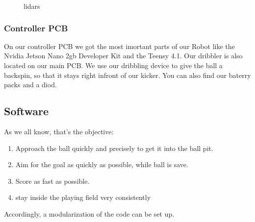 \documentclass{scrartcl}
\begin{document}
\begin{figure}[!h]
    \begin{center}
    \caption{lidars}
    \label{lidars}
    \end{center}
    \end{figure}


\subsubsection{Controller PCB}

On our controller PCB we got the most imortant parts of our Robot like the Nvidia Jetson Nano 2gb Developer Kit
and the Teensy 4.1. Our dribbler is also located on our main PCB. We use our dribbling device
to give the ball a backspin, so that it stays right infront of our kicker. You can also find our baterry packs
and a diod.

\subsection{Software} 
As we all know, that's the objective:
\begin{enumerate}
    \item{Approach the ball quickly and precisely to get it into the ball pit.}
    \item{Aim for the goal as quickly as possible, while ball is save.}
    \item{Score as fast as possible.}
    \item {stay inside the playing field very consistently}
\end{enumerate}
Accordingly, a modularization of the code can be set up.
\end{document}
